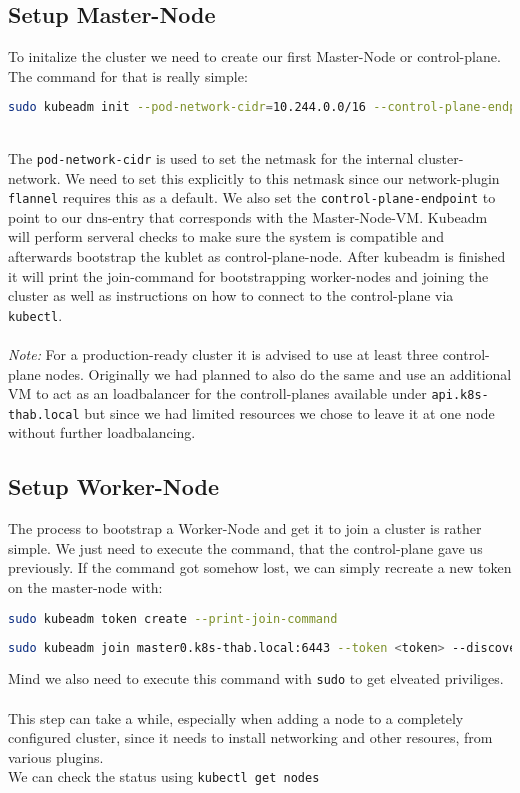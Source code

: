 \subsection{Setup Master-Node}
To initalize the cluster we need to create our first Master-Node or control-plane. The command for that is really simple:
\begin{lstlisting}[language=bash,caption=Initialize Controle-Plane] 
sudo kubeadm init --pod-network-cidr=10.244.0.0/16 --control-plane-endpoint master0.k8s-thab.local
\end{lstlisting}
\\
The \texttt{pod-network-cidr} is used to set the netmask for the internal cluster-network. We need to set this explicitly to this netmask since our network-plugin \texttt{flannel} requires this as a default.
We also set the \texttt{control-plane-endpoint} to point to our dns-entry that corresponds with the Master-Node-VM.
Kubeadm will perform serveral checks to make sure the system is compatible and afterwards bootstrap the kublet as control-plane-node.
After kubeadm is finished it will print the join-command for bootstrapping worker-nodes and joining the cluster as well as instructions on how to connect to the control-plane via \texttt{kubectl}.
\\\\
\textit{Note:} For a production-ready cluster it is advised to use at least three control-plane nodes. Originally we had planned to also do the same and use an additional VM to act as an loadbalancer for the controll-planes available under \texttt{api.k8s-thab.local} but since we had limited resources we chose to leave it at one node without further loadbalancing.

\subsection{Setup Worker-Node}
The process to bootstrap a Worker-Node and get it to join a cluster is rather simple. We just need to execute the command, that the control-plane gave us previously. If the command got somehow lost, we can simply recreate a new token on the master-node with:
\begin{lstlisting}[language=bash,caption=Get new Join-Token for Worker-Node] 
sudo kubeadm token create --print-join-command
\end{lstlisting}
\begin{lstlisting}[language=bash,caption=Example Join-Command] 
sudo kubeadm join master0.k8s-thab.local:6443 --token <token> --discovery-token-ca-cert-hash <sha256-hash>
\end{lstlisting}
Mind we also need to execute this command with \texttt{sudo} to get elveated priviliges.
\\\\
This step can take a while, especially when adding a node to a completely configured cluster, since it needs to install networking and other resoures, from various plugins.
\\
We can check the status using \texttt{kubectl get nodes}


